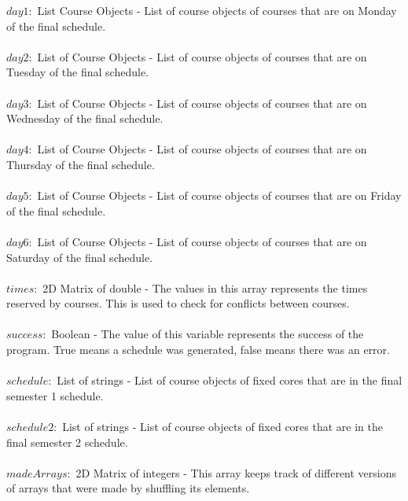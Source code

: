 \documentclass[11pt, oneside]{article}
\begin{document}
$ day1:$ List Course Objects - List of course objects of courses that are on Monday of the final schedule. \\ \\ 

$ day2:$ List of Course Objects - List of course objects of courses that are on Tuesday of the final schedule. \\ \\ 

$ day3:$ List of Course Objects - List of course objects of courses that are on Wednesday of the final schedule. \\ \\ 

$ day4:$ List of Course Objects - List of course objects of courses that are on Thursday of the final schedule. \\ \\ 

$ day5:$ List of Course Objects - List of course objects of courses that are on Friday of the final schedule. \\ \\ 

$ day6:$ List of Course Objects - List of course objects of courses that are on Saturday of the final schedule. \\ \\ 

$ times: $ 2D Matrix of double - The values in this array represents the times reserved by courses. This is used to check for conflicts between courses. \\ \\

$ success:$ Boolean - The value of this variable represents the success of the program. True means a schedule was generated, false means there was an error.\\ \\

$ schedule:$ List of strings - List of course objects of fixed cores that are in the final semester 1 schedule.\\ \\

$ schedule2: $ List of strings - List of course objects of fixed cores that are in the final semester 2 schedule.\\ \\

$ madeArrays:$ 2D Matrix of integers - This array keeps track of different versions of arrays that were made by shuffling its elements. \\ \\
\end{document}
